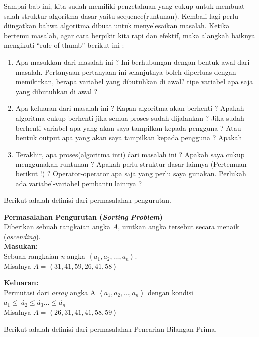 Sampai bab ini, kita sudah memiliki pengetahuan yang cukup untuk membuat salah struktur algoritma dasar yaitu sequence(runtunan).  Kembali lagi perlu diingatkan bahwa algoritma dibuat untuk menyelesaikan masalah. Ketika bertemu masalah, agar cara berpikir kita rapi dan efektif, maka alangkah baiknya mengikuti ``rule of thumb'' berikut ini : 
\begin{enumerate}
	\item Apa masukkan dari masalah ini ? Ini berhubungan dengan bentuk awal dari  masalah. Pertanyaan-pertanyaan ini selanjutnya boleh diperluas dengan memikirkan, berapa variabel yang dibutuhkan di awal? tipe variabel apa saja yang dibutuhkan  di awal ?
	\item Apa keluaran dari masalah ini ? Kapan algoritma akan berhenti ? Apakah algoritma cukup berhenti jika semua proses sudah dijalankan ?  Jika sudah berhenti variabel apa yang akan saya tampilkan kepada pengguna ? Atau bentuk output apa yang akan saya tampilkan kepada pengguna ?  Apakah 
	\item Terakhir, apa proses(algoritma inti) dari masalah ini ? Apakah saya cukup menggunakan runtunan ? Apakah perlu struktur dasar lainnya (Pertemuan berikut !) ? Operator-operator apa saja yang perlu saya gunakan. Perlukah ada variabel-variabel pembantu lainnya ?
\end{enumerate}
Berikut adalah definisi dari permasalahan pengurutan.
\begin{contoh}
\label{cth:pengurutan}
\textbf{Permasalahan Pengurutan (\textit{Sorting Problem})}\\
Diberikan sebuah rangkaian angka $A$, urutkan angka tersebut secara menaik (\textit{ascending}).\\
\textbf{Masukan:}\\
Sebuah rangkaian \textit{n} angka $\left\langle a_{1},a_{2},\ldots,a_{n} \right\rangle$.\\
Misalnya $A = \left\langle 31,41,59,26,41,58 \right\rangle$

\textbf{Keluaran:}\\ 
Permutasi dari \textit{array} angka A $\left\langle a_{1},a_{2},\ldots,a_{n}\right\rangle$ dengan kondisi $\acute{a_{1}} \leq\ \acute{a_{2}} \leq \acute{a_{3}} \ldots \leq \acute{a_{n}}$ \\
Misalnya $A = \left\langle 26,31,41,41,58,59 \right\rangle$
\end{contoh}
Berikut adalah definisi dari permasalahan Pencarian Bilangan Prima.
